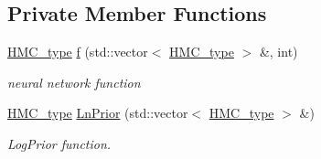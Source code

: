 \subsection*{Private Member Functions}
\begin{DoxyCompactItemize}
\item 
\hyperlink{define__type_8h_a9adf655d34223b34db3baff5c7ce420c}{H\-M\-C\-\_\-type} \hyperlink{class_b_n_n__regression_a0f6edf9b223a6aa5fff75b9678592500}{f} (std\-::vector$<$ \hyperlink{define__type_8h_a9adf655d34223b34db3baff5c7ce420c}{H\-M\-C\-\_\-type} $>$ \&, int)
\begin{DoxyCompactList}\small\item\em neural network function \end{DoxyCompactList}\item 
\hyperlink{define__type_8h_a9adf655d34223b34db3baff5c7ce420c}{H\-M\-C\-\_\-type} \hyperlink{class_b_n_n__regression_ac1006eb66df1e5a874c47eb1dae22c81}{Ln\-Prior} (std\-::vector$<$ \hyperlink{define__type_8h_a9adf655d34223b34db3baff5c7ce420c}{H\-M\-C\-\_\-type} $>$ \&)
\begin{DoxyCompactList}\small\item\em Log\-Prior function. \end{DoxyCompactList}\end{DoxyCompactItemize}
